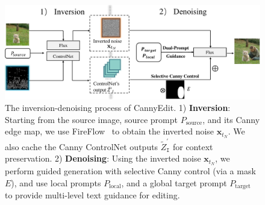 \documentclass{article}
\begin{document}
\begin{figure}[t]
    \centering
    \includegraphics[width=0.8\linewidth]{figures/framework3.pdf}
    \vspace{-1mm}
    \caption{The inversion-denoising process of CannyEdit. 1) \textbf{Inversion}: Starting from the source image, source prompt \( P_\text{source} \), and its Canny edge map, we use FireFlow~\citep{deng2024fireflow} to obtain the inverted noise \( \mathbf{x}_{t_N} \). We also cache the Canny ControlNet outputs \( \tilde{Z}^{\prime}_{\texttt{I}} \) for context preservation. 2) \textbf{Denoising}: Using the inverted noise \( \mathbf{x}_{t_N} \), we perform guided generation with selective Canny control (via a mask $E$), and use local prompts \( P_\text{local} \), and a global target prompt \( P_\text{target} \) to provide multi-level text guidance for editing.}
    \label{fig:framework}
\end{figure}
\end{document}
